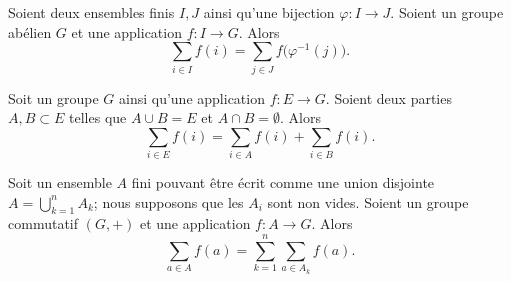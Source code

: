 \begin{lemma}		\label{LEMooGAMAooOAFhrc}
	Soient deux ensembles finis \( I,J\) ainsi qu'une bijection \(\varphi \colon I\to J  \). Soient un groupe abélien \( G\) et une application \(f \colon I\to G  \). Alors
	\begin{equation}
		\sum_{i\in I}f(i)=\sum_{j\in J}f\big( \varphi^{-1}(j) \big).
	\end{equation}
\end{lemma}

\begin{lemma}	\label{LEMooQDFLooVTwJQq}
	Soit un groupe \( G\) ainsi qu'une application \(f \colon E\to G  \). Soient deux parties \( A,B\subset E\) telles que \( A\cup B=E\) et \( A\cap B=\emptyset\). Alors
	\begin{equation}
		\sum_{i\in E}f(i)=\sum_{i\in A}f(i)+\sum_{i\in B}f(i).
	\end{equation}
\end{lemma}


\begin{lemma}		\label{LEMooNDBYooAGEkmw}
	Soit un ensemble \( A\) fini pouvant être écrit comme une union disjointe \( A=\bigcup_{k=1}^nA_k\); nous supposons que les \( A_i\) sont non vides. Soient un groupe commutatif \( (G,+)\) et une application \( f\colon A\to G\). Alors
	\begin{equation}
		\sum_{a\in A}f(a)=\sum_{k=1}^n\sum_{a\in A_k}f(a).
	\end{equation}
\end{lemma}


